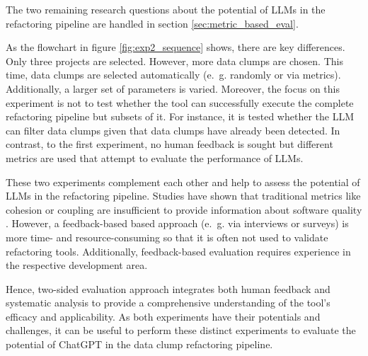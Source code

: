 The two remaining research questions about the potential of \acp{LLM} in the refactoring pipeline are handled in section \ref{sec:metric_based_eval}.

 As the flowchart in figure \ref{fig:exp2_sequence} shows, there are key differences. Only three projects are selected. However, more data clumps are chosen. This time, data clumps are selected automatically (e.~g. randomly or via metrics). Additionally, a larger set of parameters is varied. Moreover, the focus on this experiment is not to test whether the tool can successfully execute the complete refactoring pipeline but subsets of it. For instance, it is tested whether the \ac{LLM} can filter data clumps given that data clumps have already been detected. In contrast, to the first experiment, no human feedback is sought but different metrics are used that attempt to evaluate the performance of \acp{LLM}. 


These two experiments complement each other and help to assess the potential of \acp{LLM} in the refactoring pipeline. 
Studies have shown that traditional metrics like cohesion or coupling are insufficient to provide information about software quality \cite{search_based_refactoring}.  However,  a feedback-based based approach (e.~g. via interviews or surveys) is more time- and resource-consuming so that it is often  not used to validate refactoring tools. Additionally, feedback-based evaluation  requires experience  in the respective development area. \cite{automatic_software_refactoring_literature_review}

Hence,  two-sided evaluation approach integrates both human feedback and systematic analysis to provide a comprehensive understanding of the tool's efficacy and applicability.
As both experiments have their potentials and challenges, it can be useful to perform these distinct experiments to evaluate the potential of ChatGPT in the data clump refactoring pipeline.














